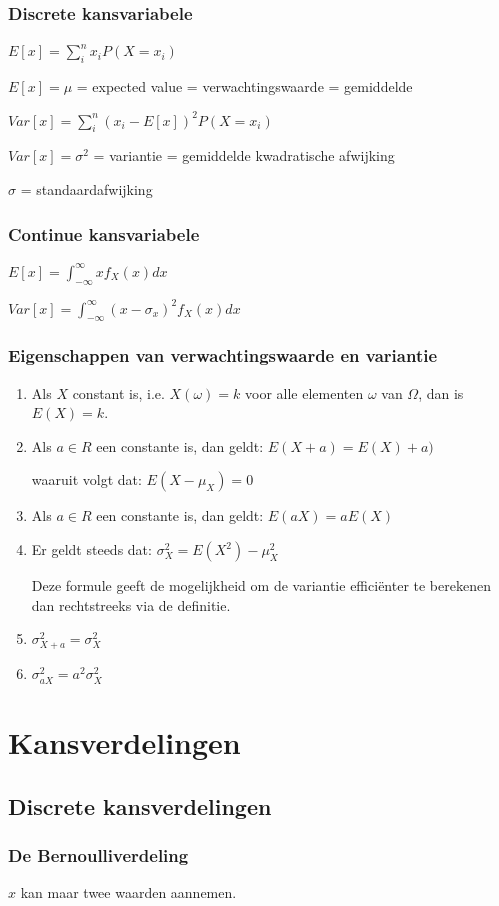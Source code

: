 \documentclass[a4paper,12pt]{article}
\begin{document}
\subsubsection{Discrete kansvariabele}
$E[x]= \sum_i^nx_iP(X=x_i)$

$E[x] = \mu$ = expected value = verwachtingswaarde = gemiddelde

$Var[x]=\sum_i^n(x_i-E[x])^2P(X=x_i)$

$Var[x] = \sigma^2$ = variantie = gemiddelde kwadratische afwijking

$\sigma$ = standaardafwijking

\subsubsection{Continue kansvariabele}
$E[x]=\int^\infty_{-\infty}xf_X(x)dx$

$Var[x]=\int^\infty_{-\infty}(x-\sigma_x)^2f_X(x)dx$

\subsubsection{Eigenschappen van verwachtingswaarde en variantie}
\begin{enumerate}
\item Als $X$ constant is, i.e. $X(\omega)=k$ voor alle elementen $\omega$ van  $\Omega$, dan is $E(X)=k$.
\item Als $a \in R$ een constante is, dan geldt:
$E(X+a)=E(X)+a)$

waaruit volgt dat: $E(X-\mu_X)=0$
\item Als $ a \in R$ een constante is, dan geldt:
$E(aX)=aE(X)$
\item Er geldt steeds dat:
$\sigma^2_X=E(X^2)-\mu^2_X$

Deze formule geeft de mogelijkheid om de variantie efficiënter te berekenen dan rechtstreeks via de definitie.
\item $\sigma^2_{X+a}=\sigma^2_X$
\item $\sigma^2_{aX}=a^2\sigma^2_X$
\end{enumerate}

\section{Kansverdelingen}
\subsection{Discrete kansverdelingen}
\subsubsection{De Bernoulliverdeling}
$x$ kan maar twee waarden aannemen.
\end{document}
